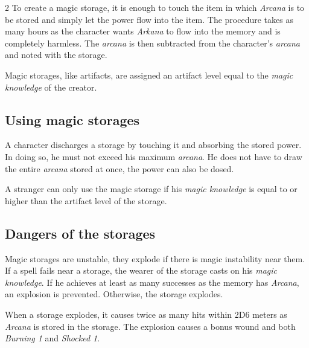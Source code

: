 \begin{multicols}{2}
To create a magic storage, it is enough to touch the item in which \textit{Arcana} is to be stored and simply let the power flow into the item. The procedure takes as many hours as the character wants \textit{Arkana} to flow into the memory and is completely harmless. The \textit{arcana} is then subtracted from the character's \textit{arcana} and noted with the storage.

Magic storages, like artifacts, are assigned an artifact level equal to the \textit{magic knowledge} of the creator.

\subsection{Using magic storages}

A character discharges a storage by touching it and absorbing the stored power. In doing so, he must not exceed his maximum \textit{arcana}. He does not have to draw the entire \textit{arcana} stored at once, the power can also be dosed.

A stranger can only use the magic storage if his \textit{magic knowledge} is equal to or higher than the artifact level of the storage.

\subsection{Dangers of the storages}

Magic storages are unstable, they explode if there is magic instability near them. If a spell fails near a storage, the wearer of the storage casts on his \textit{magic knowledge}. If he achieves at least as many successes as the memory has \textit{Arcana}, an explosion is prevented. Otherwise, the storage explodes.

When a storage explodes, it causes twice as many hits within 2D6 meters as \textit{Arcana} is stored in the storage. The explosion causes a bonus wound and both \textit{Burning 1} and \textit{Shocked 1}.
\end{multicols}
